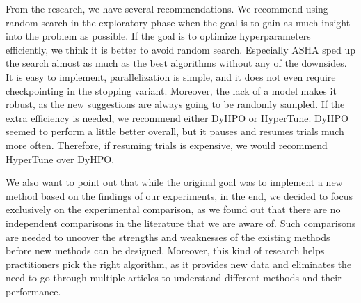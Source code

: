 

From the research, we have several recommendations. We recommend using random search in the exploratory phase when the goal is to gain as much insight into the problem as possible. If the goal is to optimize hyperparameters efficiently, we think it is better to avoid random search. Especially ASHA sped up the search almost as much as the best algorithms without any of the downsides. It is easy to implement, parallelization is simple, and it does not even require checkpointing in the stopping variant. Moreover, the lack of a model makes it robust, as the new suggestions are always going to be randomly sampled. If the extra efficiency is needed, we recommend either DyHPO or HyperTune. DyHPO seemed to perform a little better overall, but it pauses and resumes trials much more often. Therefore, if resuming trials is expensive, we would recommend HyperTune over DyHPO.\@

We also want to point out that while the original goal was to implement a new method based on the findings of our experiments, in the end, we decided to focus exclusively on the experimental comparison, as we found out that there are no independent comparisons in the literature that we are aware of. Such comparisons are needed to uncover the strengths and weaknesses of the existing methods before new methods can be designed. Moreover, this kind of research helps practitioners pick the right algorithm, as it provides new data and eliminates the need to go through multiple articles to understand different methods and their performance.


